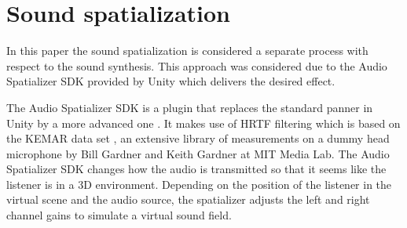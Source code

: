 \section{Sound spatialization}

In this paper the sound spatialization is considered a separate process with respect to the sound synthesis. This approach was considered due to the Audio Spatializer \gls{SDK} provided by Unity\textsuperscript{\textregistered} which delivers the desired effect.

The Audio Spatializer \gls{SDK} is a plugin that replaces the standard panner in Unity\textsuperscript{\textregistered} by a more advanced one \cite{bib:unity_doc}. It makes use of \gls{HRTF} filtering which is based on the KEMAR data set \cite{bib:kemar}, an extensive library of  measurements on a dummy head microphone by Bill Gardner and Keith Gardner at MIT Media Lab. The Audio Spatializer \gls{SDK} changes how the audio is transmitted so that it seems like the listener is in a 3D environment. Depending on the position of the listener in the virtual scene and the audio source, the spatializer adjusts the left and right channel gains to simulate a virtual sound field.



